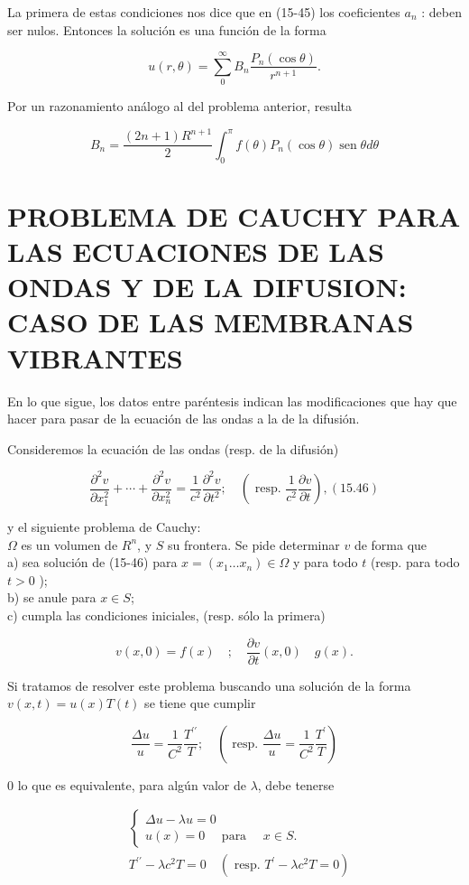 \documentclass[10pt]{article}
\theoremstyle{plain}
\theoremstyle{definition}
\theoremstyle{remark}
\begin{document}
La primera de estas condiciones nos dice que en (15-45) los coeficientes $a_{n}$ : deben ser nulos. Entonces la solución es una función de la forma

$$
u(r, \theta)=\sum_{0}^{\infty} B_{n} \frac{P_{n}(\cos \theta)}{r^{n+1}} .
$$

Por un razonamiento análogo al del problema anterior, resulta

$$
B_{n}=\frac{(2 n+1) R^{n+1}}{2} \int_{0}^{\pi} f(\theta) P_{n}(\cos \theta) \operatorname{sen} \theta d \theta
$$

\section*{PROBLEMA DE CAUCHY PARA LAS ECUACIONES DE LAS ONDAS Y DE LA DIFUSION: CASO DE LAS MEMBRANAS VIBRANTES}
En lo que sigue, los datos entre paréntesis indican las modificaciones que hay que hacer para pasar de la ecuación de las ondas a la de la difusión.

Consideremos la ecuación de las ondas (resp. de la difusión)

$$
\frac{\partial^{2} v}{\partial x_{1}^{2}}+\cdots+\frac{\partial^{2} v}{\partial x_{n}^{2}}=\frac{1}{c^{2}} \frac{\partial^{2} v}{\partial t^{2}} ; \quad\left(\text { resp. } \frac{1}{c^{2}} \frac{\partial v}{\partial t}\right),(15.46)
$$

y el siguiente problema de Cauchy:\\
$\Omega$ es un volumen de $R^{n}$, y $S$ su frontera. Se pide determinar $v$ de forma que\\
a) sea solución de (15-46) para $x=\left(x_{1} \ldots x_{n}\right) \in \Omega$ y para todo $t$ (resp. para todo $t>0$ );\\
b) se anule para $x \in S$;\\
c) cumpla las condiciones iniciales, (resp. sólo la primera)

$$
v(x, 0)=f(x) \quad ; \quad \frac{\partial v}{\partial t}(x, 0) \quad g(x) .
$$

Si tratamos de resolver este problema buscando una solución de la forma $v(x, t)=u(x) T(t)$ se tiene que cumplir

$$
\frac{\Delta u}{u}=\frac{1}{C^{2}} \frac{T^{\prime \prime}}{T} ; \quad\left(\text { resp. } \frac{\Delta u}{u}=\frac{1}{C^{2}} \frac{T^{\prime}}{T}\right)
$$

0 lo que es equivalente, para algún valor de $\lambda$, debe tenerse


\begin{align*}
& \left\{\begin{array}{l}
\Delta u-\lambda u=0 \\
u(x)=0 \quad \text { para } \quad x \in S .
\end{array}\right.  \tag{15-47}\\
& T^{\prime \prime}-\lambda c^{2} T=0 \quad\left(\text { resp. } T^{\prime}-\lambda c^{2} T=0\right)
\end{align*}
\end{document}
